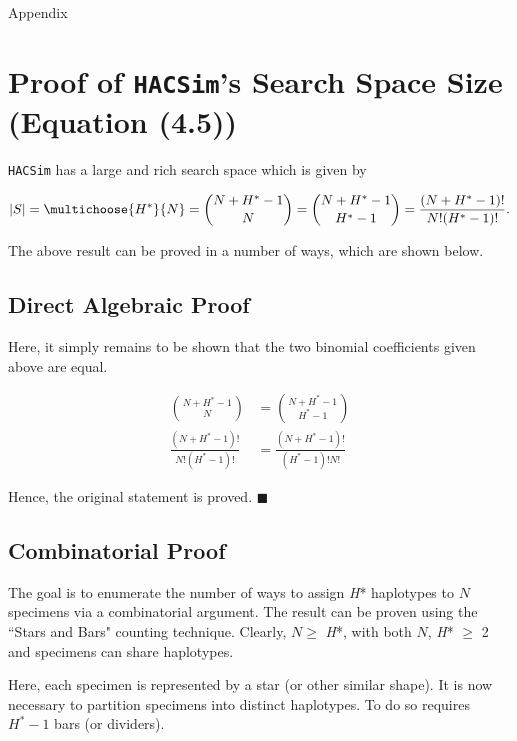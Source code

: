 Appendix

\chapter{Proof of {\tt HACSim}'s Search Space Size (Equation (4.5))}

{\tt HACSim} has a large and rich search space which is given by

\begin{equation}
|S| = \multichoose{H^*}{N} = {{N + H^* - 1}\choose{N}} = {{N + H^* - 1}\choose{H^* - 1}} = \frac{(N + H^* - 1)!}{N!(H^* - 1)!}.
\end{equation}

\noindent The above result can be proved in a number of ways, which are shown below.

\section{Direct Algebraic Proof}

Here, it simply remains to be shown that the two binomial coefficients given above are equal. 

\vspace{5mm}

\begin{align*}
\binom{N + H^* - 1}{N} &= \binom{N + H^* - 1}{H^* - 1} \\
\frac{(N + H^* - 1)!}{N!(H^* - 1)!} &= \frac{(N + H^* - 1)!}{(H^* - 1)!N!}  
\end{align*} 

Hence, the original statement is proved. $\blacksquare$ 



\section{Combinatorial Proof}

The goal is to enumerate the number of ways to assign \textit{H}* haplotypes to $N$ specimens via a combinatorial argument. The result can be proven using the ``Stars and Bars" counting technique. Clearly, $N \geq$ \textit{H}*, with both $N$, \textit{H}* $\geq$ 2 and specimens can share haplotypes.

\vspace{5mm} 

Here, each specimen is represented by a star (or other similar shape). It is now necessary to partition specimens into distinct haplotypes. To do so requires $H^* - 1$ bars (or dividers). 

